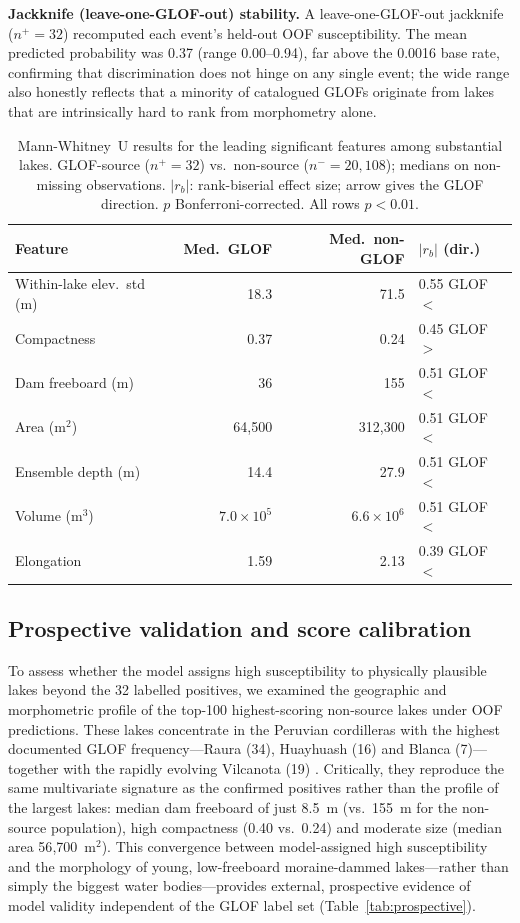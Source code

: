 \documentclass[pdflatex,sn-basic]{sn-jnl}%
\begin{document}
\textbf{Jackknife (leave-one-GLOF-out) stability.}
A leave-one-GLOF-out jackknife ($n^+\!=\!32$) recomputed each event's
held-out OOF susceptibility. The mean predicted probability was 0.37
(range 0.00--0.94), far above the 0.0016 base rate, confirming that
discrimination does not hinge on any single event; the wide range also
honestly reflects that a minority of catalogued GLOFs originate from lakes
that are intrinsically hard to rank from morphometry alone.

\begin{table}[!t]
\caption{Mann-Whitney~U results for the leading significant features among
  substantial lakes. GLOF-source ($n^+\!=\!32$) vs.\ non-source
  ($n^-\!=\!20{,}108$); medians on non-missing observations.
  $|r_b|$: rank-biserial effect size; arrow gives the GLOF direction.
  $p$ Bonferroni-corrected. All rows $p<0.01$.}
\label{tab:mannwhitney}
\centering
\begin{tabular*}{\textwidth}{@{\extracolsep{\fill}}lrrl}
\toprule
\textbf{Feature} & \textbf{Med.\ GLOF}
  & \textbf{Med.\ non-GLOF} & \textbf{$|r_b|$ (dir.)} \\
\midrule
Within-lake elev.\ std (m)
  & 18.3 & 71.5 & 0.55 GLOF$<$ \\
Compactness
  & 0.37 & 0.24 & 0.45 GLOF$>$ \\
Dam freeboard (m)
  & 36 & 155 & 0.51 GLOF$<$ \\
Area (m$^2$)
  & 64{,}500 & 312{,}300 & 0.51 GLOF$<$ \\
Ensemble depth (m)
  & 14.4 & 27.9 & 0.51 GLOF$<$ \\
Volume (m$^3$)
  & $7.0{\times}10^5$ & $6.6{\times}10^6$ & 0.51 GLOF$<$ \\
Elongation
  & 1.59 & 2.13 & 0.39 GLOF$<$ \\
\bottomrule
\end{tabular*}
\end{table}

\subsection{Prospective validation and score calibration}
\label{sec:prospective}

To assess whether the model assigns high susceptibility to physically
plausible lakes beyond the 32 labelled positives, we examined the
geographic and morphometric profile of the top-100 highest-scoring
non-source lakes under OOF predictions.
These lakes concentrate in the Peruvian cordilleras with the highest
documented GLOF frequency---Raura (34), Huayhuash (16) and Blanca
(7)---together with the rapidly evolving Vilcanota (19)
\citep{Emmer2022,Carey2010,EmmerHarrison2020}. Critically, they reproduce
the same multivariate signature as the confirmed positives rather than
the profile of the largest lakes: median dam freeboard of just 8.5~m
(vs.\ 155~m for the non-source population), high compactness (0.40 vs.\
0.24) and moderate size (median area 56{,}700~m$^2$). This convergence
between model-assigned high susceptibility and the morphology of young,
low-freeboard moraine-dammed lakes---rather than simply the biggest water
bodies---provides external, prospective evidence of model validity
independent of the GLOF label set (Table~\ref{tab:prospective}).
\end{document}
